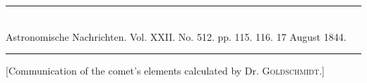 \bigskip
\hypertarget{native-472-notice}{}
\begin{center}
\rule{0.55\linewidth}{0.4pt}\\[2pt]
Astronomische Nachrichten. Vol. XXII. No. 512. pp. 115. 116. 17 August 1844.\\[2pt]
\rule{0.55\linewidth}{0.4pt}
\end{center}

[Communication of the comet’s elements calculated by Dr. \textsc{Goldschmidt}.]

